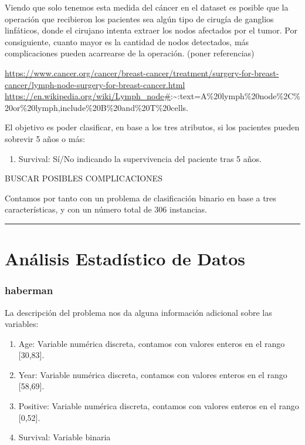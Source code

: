 \documentclass[
]{article}
\providecommand{\tightlist}{%
  \setlength{\itemsep}{0pt}\setlength{\parskip}{0pt}}
\begin{document}
Viendo que solo tenemos esta medida del cáncer en el dataset es posible
que la operación que recibieron los pacientes sea algún tipo de cirugía
de ganglios linfáticos, donde el cirujano intenta extraer los nodos
afectados por el tumor. Por consiguiente, cuanto mayor es la cantidad de
nodos detectados, más complicaciones pueden acarrearse de la operación.
(poner referencias)

\url{https://www.cancer.org/cancer/breast-cancer/treatment/surgery-for-breast-cancer/lymph-node-surgery-for-breast-cancer.html}
\url{https://en.wikipedia.org/wiki/Lymph_node\#}:\textasciitilde:text=A\%20lymph\%20node\%2C\%20or\%20lymph,include\%20B\%20and\%20T\%20cells.

El objetivo es poder clasificar, en base a los tres atributos, si los
pacientes pueden sobrevir 5 años o más:

\begin{enumerate}
\def\labelenumi{\arabic{enumi}.}
\setcounter{enumi}{3}
\tightlist
\item
  Survival: Sí/No indicando la supervivencia del paciente tras 5 años.
\end{enumerate}

BUSCAR POSIBLES COMPLICACIONES

Contamos por tanto con un problema de clasificación binario en base a
tres características, y con un número total de 306 instancias.

\begin{center}\rule{0.5\linewidth}{0.5pt}\end{center}

\hypertarget{anuxe1lisis-estaduxedstico-de-datos}{%
\section{Análisis Estadístico de
Datos}\label{anuxe1lisis-estaduxedstico-de-datos}}

\hypertarget{haberman-1}{%
\subsubsection{haberman}\label{haberman-1}}

La descripción del problema nos da alguna información adicional sobre
las variables:

\begin{enumerate}
\def\labelenumi{\arabic{enumi}.}
\tightlist
\item
  Age: Variable numérica discreta, contamos con valores enteros en el
  rango {[}30,83{]}.
\item
  Year: Variable numérica discreta, contamos con valores enteros en el
  rango {[}58,69{]}.
\item
  Positive: Variable numérica discreta, contamos con valores enteros en
  el rango {[}0,52{]}.
\item
  Survival: Variable binaria
\end{enumerate}
\end{document}
